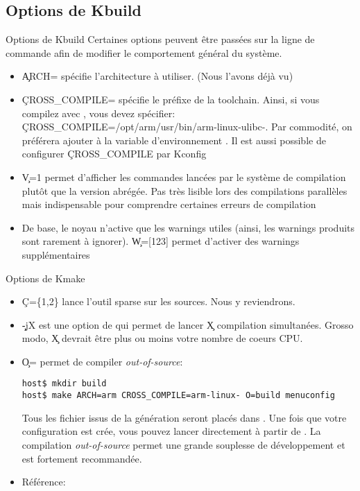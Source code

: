 \subsection{Options de Kbuild}

\begin{frame}[fragile=singleslide]{Options de Kbuild}
  Certaines options peuvent être passées sur la ligne de commande afin
  de modifier le comportement général du système.
  \begin{itemize}
  \item  \c{ARCH=} spécifie l'architecture  à utiliser.  (Nous l'avons
    déjà vu)
  \item \c{CROSS_COMPILE=} spécifie le préfixe de la toolchain. Ainsi,
    si vous  compilez avec ,
    vous                        devez                       spécifier:
    \c{CROSS_COMPILE=/opt/arm/usr/bin/arm-linux-ulibc-}.            Par
    commodité,  on  préférera   ajouter    à  la
    variable  d'environnement  .  Il  est aussi  possible  de
    configurer \c{CROSS_COMPILE} par Kconfig
  \item \c{V=1} permet d'afficher les commandes lancées par le système
    de  compilation plutôt que  la version  abrégée. Pas  très lisible
    lors   des  compilations   parallèles   mais  indispensable   pour
    comprendre certaines erreurs de compilation
  \item De base, le noyau n'active que les warnings utiles (ainsi, les
    warnings  produits sont rarement  à ignorer).   \c{W=[123]} permet
    d'activer des warnings supplémentaires
\end{itemize} 
\end{frame} 

\begin{frame}[fragile=singleslide]{Options de Kmake}
  \begin{itemize} 
  \item  \c{C=\{1,2\}} lance l'outil  sparse sur  les sources.  Nous y
    reviendrons.
  \item  \c{-jX} est  une option  de   qui permet  de lancer
    \c{X}  compilation simultanées.  Grosso  modo, \c{X}  devrait être
    plus ou moins votre nombre de coeurs CPU.
  \item \c{O=} permet de compiler \emph{out-of-source}:
    \begin{lstlisting}
host$ mkdir build
host$ make ARCH=arm CROSS_COMPILE=arm-linux- O=build menuconfig
    \end{lstlisting} %
    Tous  les  fichier  issus  de  la génération  seront  placés  dans
    .  Une fois  que  votre configuration  est crée,  vous
    pouvez lancer  directement  à partir de . La
    compilation  \emph{out-of-source} permet  une grande  souplesse de
    développement et est fortement recommandée.
  \item Référence: 
  \end{itemize} 
\end{frame}

